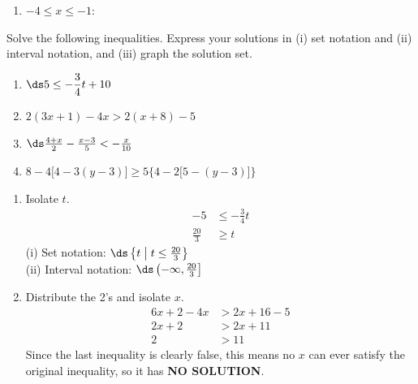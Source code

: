 \documentclass{ximera}
\begin{document}
\begin{problem}
\begin{solution}
\begin{enumerate}
  \item $-4 \leq x \leq -1$:

\end{enumerate}
\end{solution}
\end{problem}


\begin{problem}
Solve the following inequalities. Express your solutions in (i) set notation and (ii) interval
notation, and (iii) graph the solution set.
\begin{enumerate}
  \item[(a)] $\ds 5 \leq -\dfrac{3}{4}t + 10$
  \medskip
  \item[(b)] $2(3x+1) - 4x > 2(x+8) - 5$
  \medskip
  \item[(c)] $\ds\frac{4+x}{2} - \frac{x-3}{5} < -\frac{x}{10}$
  \medskip
  \item[(d)] $8 - 4\big[4 - 3(y-3)\big] \geq 5\Big\{4-2\big[5-(y-3)\big]\Big\}$
\end{enumerate}

\begin{solution}
\begin{enumerate}
  \item[(a)] Isolate $t$.
  \begin{align*}
    -5 &\leq -\frac{3}{4}t \\
    \frac{20}{3} &\geq t
  \end{align*}
  (i) Set notation: $\ds\left\{t\;\middle|\;t\leq \frac{20}{3}\right\}$\\
  (ii) Interval notation: $\ds\left(-\infty,\frac{20}{3}\right]$

  \item[(b)] Distribute the 2's and isolate $x$.
  \begin{align*}
    6x + 2 - 4x &> 2x + 16 - 5\\
    2x+2 &> 2x + 11\\
    2 &> 11
  \end{align*}
  Since the last inequality is clearly false, this means no $x$ can ever satisfy the original
  inequality, so it has \textbf{NO SOLUTION}.


\end{enumerate}
\end{solution}
\end{problem}
\end{document}
